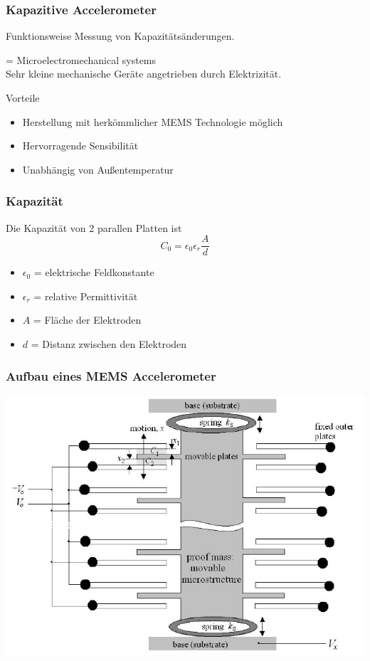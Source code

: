 \documentclass[10pt,a4paper,oneside]{beamer}
\begin{document}
\begin{frame}
	\frametitle{Kapazitive Accelerometer}
	\begin{block}{Funktionsweise}
		Messung von Kapazitätsänderungen.
	\end{block}
 	\begin{definition}[MEMS]
  	= Microelectromechanical systems \\
  	Sehr kleine mechanische Geräte angetrieben durch Elektrizität.
  	\end{definition}
    \bigskip
   
	Vorteile
 	\begin{itemize}
 		\item Herstellung mit herkömmlicher MEMS Technologie möglich
 		\item Hervorragende Sensibilität
		\item Unabhängig von Außentemperatur
 	\end{itemize}
\end{frame}

\begin{frame}
	\frametitle{Kapazität}
	Die Kapazität von 2 parallen Platten ist \cite{AM08}
	\begin{equation}
		C_{0} = \epsilon_{0} \epsilon_{r} \frac{A}{d}
	\end{equation}
	\begin{itemize}
		\item $\epsilon_{0}$ = elektrische Feldkonstante
		\item $\epsilon_{r}$ = relative Permittivität
		\item $A$ = Fläche der Elektroden
		\item $d$ = Distanz zwischen den Elektroden
	\end{itemize}

\end{frame}

\begin{frame}
	\frametitle{Aufbau eines MEMS Accelerometer}
\includegraphics[width=\textwidth]{images/acceleromter_structure.png}

\end{frame}
\end{document}

